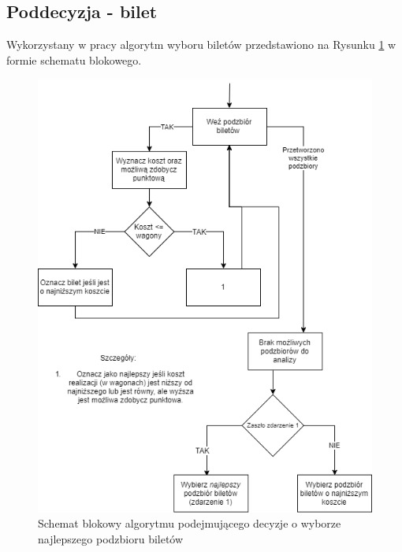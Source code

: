 \documentclass[12pt, oneside]{report}
\begin{document}
\subsection{Poddecyzja - bilet}
Wykorzystany w pracy algorytm wyboru biletów przedstawiono na Rysunku \ref{figure:bilety_diagram} w formie schematu blokowego.

\begin{figure}
	\includegraphics[width=\textwidth]{Bilety.png}
	\caption{Schemat blokowy algorytmu podejmującego decyzje o wyborze najlepszego podzbioru biletów}
	\label{figure:bilety_diagram}
\end{figure}
\end{document}
